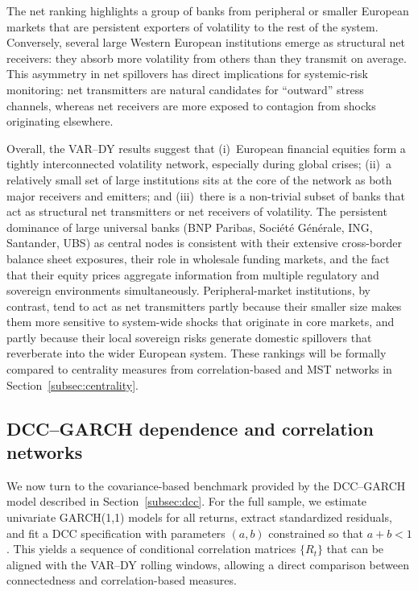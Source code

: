 The net ranking highlights a group of banks from peripheral or smaller European markets
that are persistent exporters of volatility to the rest of the system. Conversely,
several large Western European institutions emerge as structural net receivers: they
absorb more volatility from others than they transmit on average. This asymmetry in net
spillovers has direct implications for systemic-risk monitoring: net transmitters are
natural candidates for ``outward'' stress channels, whereas net receivers are more exposed
to contagion from shocks originating elsewhere.

Overall, the VAR--DY results suggest that (i)~European financial equities form a tightly
interconnected volatility network, especially during global crises; (ii)~a relatively
small set of large institutions sits at the core of the network as both major receivers
and emitters; and (iii)~there is a non-trivial subset of banks that act as structural net
transmitters or net receivers of volatility. The persistent dominance of large universal
banks (BNP Paribas, Société Générale, ING, Santander, UBS) as central nodes is
consistent with their extensive cross-border balance sheet exposures, their role in
wholesale funding markets, and the fact that their equity prices aggregate information
from multiple regulatory and sovereign environments simultaneously. Peripheral-market
institutions, by contrast, tend to act as net transmitters partly because their smaller
size makes them more sensitive to system-wide shocks that originate in core markets,
and partly because their local sovereign risks generate domestic spillovers that
reverberate into the wider European system. These rankings will be formally compared to
centrality measures from correlation-based and MST networks in Section~\ref{subsec:centrality}.

\subsection{DCC--GARCH dependence and correlation networks}

We now turn to the covariance-based benchmark provided by the DCC--GARCH model described
in Section~\ref{subsec:dcc}. For the full sample, we estimate univariate GARCH(1,1)
models for all returns, extract standardized residuals, and fit a DCC specification with
parameters $(a,b)$ constrained so that $a + b < 1$. This yields a sequence of
conditional correlation matrices $\{R_t\}$ that can be aligned with the VAR--DY rolling
windows, allowing a direct comparison between connectedness and correlation-based
measures.

